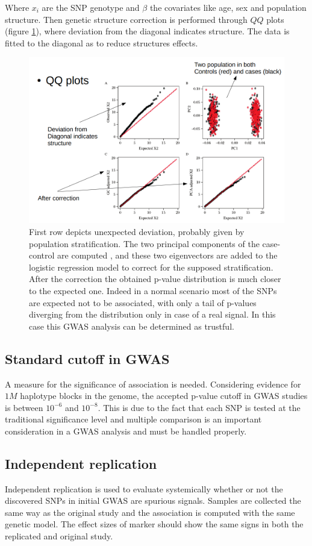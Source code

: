 			Where $x_i$ are the SNP genotype and $\beta$ the covariates like age, sex and population structure.
			Then genetic structure correction is performed through $QQ$ plots (figure \ref{fig:qq}), where deviation from the diagonal indicates structure.
			The data is fitted to the diagonal as to reduce structures effects.

			\begin{figure}[H]
			\centering
			\includegraphics[scale=0.3]{qq}
			\caption{First row depicts unexpected deviation, probably given by population stratification. The two principal components of the case-control are computed , and these two eigenvectors are added to the logistic regression model to correct for the supposed stratification. After the correction the obtained p-value distribution is much closer to the expected one. Indeed in a normal scenario most of the SNPs are expected not to be associated, with only a tail of p-values diverging from the distribution only in case of a real signal. In this case this GWAS analysis can be determined as trustful.}
			\label{fig:qq}
			\end{figure}

	\subsection{Standard cutoff in GWAS}
	A measure for the significance of association is needed.
	Considering evidence for $1M$ haplotype blocks in the genome, the accepted p-value cutoff in GWAS studies is between $10^{-6}$ and $10^{-8}$.
	This is due to the fact that each SNP is tested at the traditional significance level and multiple comparison is an important consideration in a GWAS analysis and must be handled properly.

	\subsection{Independent replication}
	Independent replication is used to evaluate systemically whether or not the discovered SNPs in initial GWAS are spurious signals.
	Samples are collected the same way as the original study and the association is computed with the same genetic model.
	The effect sizes of marker should show the same signs in both the replicated and original study.
